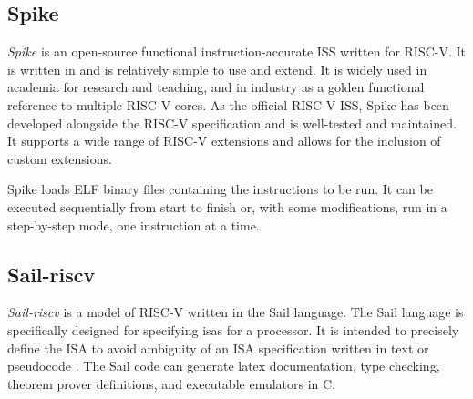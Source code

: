 \subsection{Spike}
\label{sec:spike}

\textit{Spike} \cite{SpikeRISCVISA2023} is an open-source functional instruction-accurate ISS written for \mbox{RISC-V.} It is written in \cpp and is relatively simple to use and extend. It is widely used in academia for research and teaching, and in industry as a golden functional reference to multiple RISC-V cores. As the official RISC-V ISS, Spike has been developed alongside the RISC-V specification and is well-tested and maintained. It supports a wide range of RISC-V extensions and allows for the inclusion of custom extensions.

Spike loads ELF binary files containing the instructions to be run. It can be executed sequentially from start to finish or, with some modifications, run in a step-by-step mode, one instruction at a time. 







\subsection{Sail-riscv}
\label{sec:sail}

\textit{Sail-riscv} \cite{RISCVSailModel2023} is a model of RISC-V written in the Sail language. The Sail language is specifically designed for specifying \acrshort{isa}s for a processor. It is intended to precisely define the ISA to avoid ambiguity of an ISA specification written in text or pseudocode \cite{armstrongSailInstructionsetSemantics2023}. The Sail code can generate latex documentation, type checking, theorem prover definitions, and executable emulators in C.  

